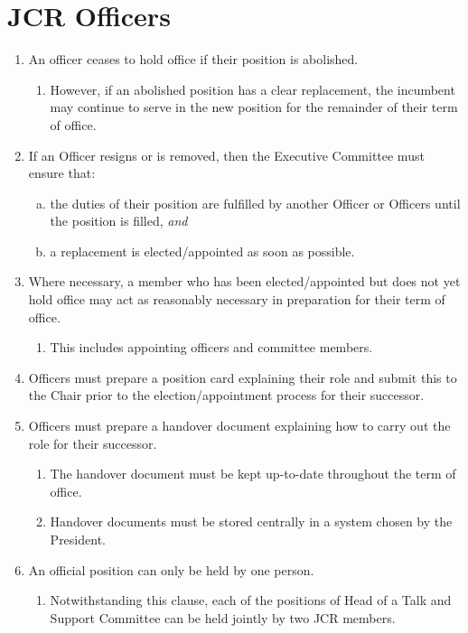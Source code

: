 \documentclass[12pt]{article}
\begin{document}
\section{JCR Officers}
\begin{enumerate}
    \item An officer ceases to hold office if their position is abolished.
    \begin{enumerate}
            \item However, if an abolished position has a clear replacement, the incumbent may continue to serve in the new position for the remainder of their term of office.
    \end{enumerate}
    \item If an Officer resigns or is removed, then the Executive Committee must ensure that:
    \begin{enumerate}[(a)]
        \item the duties of their position are fulfilled by another Officer or Officers until the position is filled, \emph{and}
        \item a replacement is elected/appointed as soon as possible.
    \end{enumerate}
    \item\label{preterm-prep} Where necessary, a member who has been elected/appointed but does not yet hold office may act as reasonably necessary in preparation for their term of office.
    \begin{enumerate}
        \item This includes appointing officers and committee members.
    \end{enumerate}
    \item Officers must prepare a position card explaining their role and submit this to the Chair prior to the election/appointment process for their successor.
    \item Officers must prepare a handover document explaining how to carry out the role for their successor.
    \begin{enumerate}
        \item The handover document must be kept up-to-date throughout the term of office.
        \item Handover documents must be stored centrally in a system chosen by the President.
    \end{enumerate}
    \item An official position can only be held by one person.
    \begin{enumerate}
        \item Notwithstanding this clause, each of the positions of Head of a Talk and Support Committee can be held jointly by two JCR members.
    \end{enumerate}
\end{enumerate}
\newpage
\end{document}
